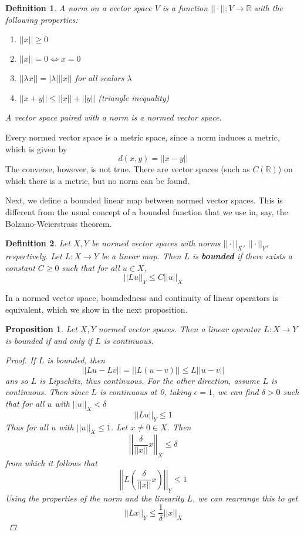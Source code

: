 \documentclass[10pt]{article}         %
\newtheorem{definition}{Definition}[section]
\newtheorem{proposition}{Proposition}[section]
\theoremstyle{remark}
\newcommand{\R}{\mathbb{R}}
\begin{document}
\begin{definition}
A \emph{norm} on a vector space $V$ is a function $|| \cdot || : V \rightarrow \R$ with the following properties:
\begin{enumerate}
\item $|| x || \geq 0$
\item $||x|| = 0 \iff x = 0$
\item $||\lambda x|| = |\lambda|  ||x||$ for all scalars $\lambda$
\item $||x+y|| \leq ||x|| + ||y||$ (triangle inequality)
\end{enumerate}
A vector space paired with a norm is a \emph{normed vector space}.
\end{definition}

Every normed vector space is a metric space, since a norm induces a metric, which is given by
\[
d(x,y) = ||x-y||
\]
The converse, however, is not true. There are vector spaces (such as $C(\R)$) on which there is a metric, but no norm can be found.

Next, we define a bounded linear map between normed vector spaces. This is different from the usual concept of a bounded function that we use in, say, the Bolzano-Weierstrass theorem.

\begin{definition}
Let $X, Y$ be normed vector spaces with norms $||\cdot||_X$, $||\cdot||_Y$, respectively. Let $L: X \rightarrow Y$ be a linear map. Then $L$ is \textbf{bounded} if there exists a constant $C \geq 0$ such that for all $u \in X$,
\[
||Lu||_Y \leq C ||u||_X
\]
\end{definition}

In a normed vector space, boundedness and continuity of linear operators is equivalent, which we show in the next proposition.

\begin{proposition}
Let $X, Y$ normed vector spaces. Then a linear operator $L: X \rightarrow Y$ is bounded if and only if $L$ is continuous.
\begin{proof}
If $L$ is bounded, then 
\[
||Lu - Lv|| = ||L(u - v)|| \leq L ||u - v||
\]
ans so $L$ is Lipschitz, thus continuous. For the other direction, assume $L$ is continuous. Then since $L$ is continuous at 0, taking $\epsilon = 1$, we can find $\delta > 0$ such that for all $u$ with $||u||_X < \delta$
\[
||Lu||_Y \leq 1
\]
Thus for all $u$ with $||u||_X \leq 1$. Let $x \neq 0 \in X$. Then 
\[
\left|\left| \frac{\delta}{||x||}x \right|\right|_X \leq \delta
\]
from which it follows that 
\[
\left|\left| L\left( \frac{\delta}{||x||}x \right) \right|\right|_Y \leq 1
\]
Using the properties of the norm and the linearity $L$, we can rearrange this to get
\[
||L x||_Y \leq \frac{1}{\delta} ||x||_X
\]
\end{proof}
\end{proposition}
\end{document}
